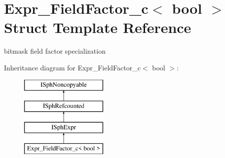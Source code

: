 \hypertarget{structExpr__FieldFactor__c_3_01bool_01_4}{\section{Expr\-\_\-\-Field\-Factor\-\_\-c$<$ bool $>$ Struct Template Reference}
\label{structExpr__FieldFactor__c_3_01bool_01_4}
}


bitmask field factor specialization  


Inheritance diagram for Expr\-\_\-\-Field\-Factor\-\_\-c$<$ bool $>$\-:\begin{figure}[H]
\begin{center}
\leavevmode
\includegraphics[height=4.000000cm]{structExpr__FieldFactor__c_3_01bool_01_4}
\end{center}
\end{figure}
